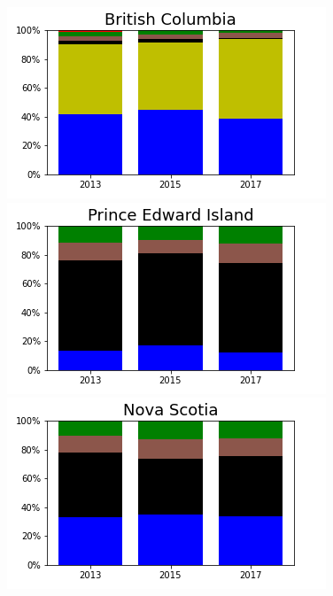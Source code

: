 \documentclass{beamer}
\begin{document}
\begin{frame}
\includegraphics[width=0.25\linewidth]{bc.png}%
\includegraphics[width=0.25\linewidth]{pe.png}%
\includegraphics[width=0.25\linewidth]{ns.png}


\end{frame}
\end{document}
